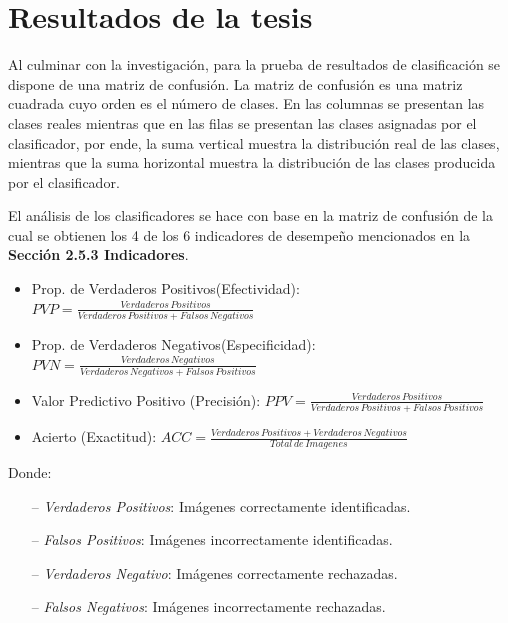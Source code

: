 \chapter{Resultados de la tesis}
\setcounter{page}{127}
\renewcommand{\baselinestretch}{1.2} %
	
	Al culminar con la investigación, para la prueba de resultados de clasificación se dispone de una matriz de confusión. La matriz de confusión es una matriz cuadrada cuyo orden es el número de clases. En las  columnas se presentan las clases reales mientras que en las filas se presentan las clases asignadas por el clasificador, por ende, la suma vertical muestra la distribución real de las clases, mientras que la suma horizontal muestra la distribución de las clases producida por el clasificador.

	El análisis de los clasificadores se hace con base en la matriz de confusión de la cual se obtienen los 4 de los 6 indicadores de desempeño mencionados en la \textbf{Sección 2.5.3 Indicadores}.

	\begin{itemize}

	\item Prop. de Verdaderos Positivos(Efectividad): {$PVP= \frac{Verdaderos\,Positivos}{{Verdaderos\,Positivos} + {Falsos\,Negativos}}$}
	\item Prop. de Verdaderos Negativos(Especificidad): {$PVN= \frac{Verdaderos\,Negativos}{{Verdaderos\,Negativos} + {Falsos\,Positivos}}$}
	\item Valor Predictivo Positivo (Precisión): {$PPV = \frac{Verdaderos\,Positivos}{{Verdaderos\,Positivos}+{Falsos\,Positivos}}$}
	\item Acierto (Exactitud): {$ACC= \frac{Verdaderos\,Positivos+Verdaderos\,Negativos}{Total\,de\,Imagenes}$}
	\end{itemize}	
	Donde:
	\begin{itemize}
		\item[--] \textit{Verdaderos Positivos}: Imágenes correctamente identificadas.
		\item[--] \textit{Falsos Positivos}: Imágenes incorrectamente identificadas.
		\item[--] \textit{Verdaderos Negativo}: Imágenes correctamente rechazadas.
		\item[--] \textit{Falsos Negativos}: Imágenes incorrectamente rechazadas.
	\end{itemize}
	
